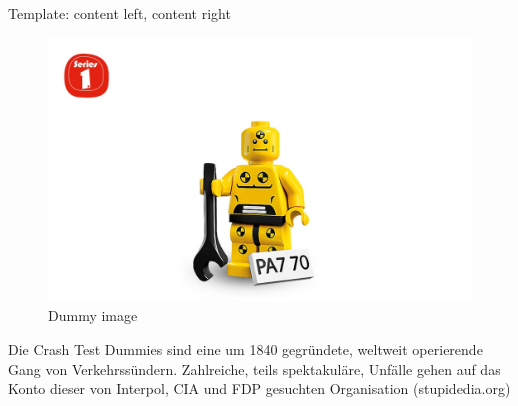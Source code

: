 \documentclass[shortpres]{beamer}
\begin{document}
\begin{frame}{Template: content left, content right}
	\begin{multicols}{2}
		\begin{figure}[t]
			\includegraphics[clip, width=0.98\linewidth]{img/dummy_image.jpg}
			\caption*{Dummy image}
		\end{figure}		
		
	\columnbreak
	
		Die Crash Test Dummies sind eine um 1840 gegründete, weltweit operierende Gang von Verkehrssündern. Zahlreiche, teils spektakuläre, Unfälle gehen auf das Konto dieser von Interpol, CIA und FDP gesuchten Organisation (stupidedia.org)
	\end{multicols}
\end{frame}
\end{document}
